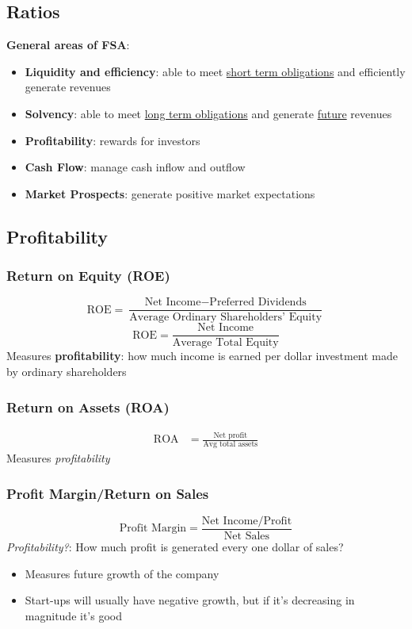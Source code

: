 \documentclass{article}
\begin{document}
\begin{multicols}{2}
\section{Ratios}
\textbf{General areas of FSA}:
\begin{itemize}
	\item \textbf{Liquidity and efficiency}: able to meet \underline{short term obligations} and efficiently generate revenues
	\item \textbf{Solvency}: able to meet \underline{long term obligations} and generate \underline{future} revenues
	\item \textbf{Profitability}: rewards for investors
	\item \textbf{Cash Flow}: manage cash inflow and outflow
	\item \textbf{Market Prospects}: generate positive market expectations
\end{itemize}

\subsection{Profitability}
\subsubsection{Return on Equity (ROE)}
$$\text{ROE} = \frac{\text{Net Income} - \text{Preferred Dividends}}{\text{Average Ordinary Shareholders' Equity}}$$
$$\text{ROE} = \frac{\text{Net Income}}{\text{Average Total Equity}}$$
Measures \textbf{profitability}: how much income is earned per dollar investment made by ordinary shareholders

\subsubsection{Return on Assets (ROA)}
\begin{equation*}
	\begin{aligned}
		\text{ROA} &= \frac{\text{Net profit}}{\text{Avg total assets}}
	\end{aligned}
\end{equation*}
Measures \textit{profitability}

\subsubsection{Profit Margin/Return on Sales}
$$\text{Profit Margin} = \frac{\text{Net Income/Profit}}{\text{Net Sales}}$$
\textit{Profitability?}: How much profit is generated every one dollar of sales?
\begin{itemize}
	\item Measures future growth of the company
	\item Start-ups will usually have negative growth, but if it's decreasing in magnitude it's good
\end{itemize}


\end{multicols}
\end{document}
